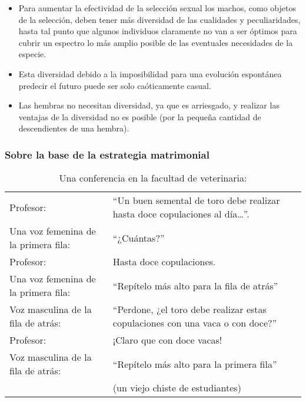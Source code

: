 \begin{itemize}
\tightlist
\item
  Para aumentar la efectividad de la selección sexual los machos, como
  objetos de la selección, deben tener más diversidad de las cualidades
  y peculiaridades, hasta tal punto que algunos individuos claramente no
  van a ser óptimos para cubrir un espectro lo más amplio posible de las
  eventuales necesidades de la especie.
\item
  Esta diversidad debido a la imposibilidad para una evolución
  espontánea predecir el futuro puede ser solo caóticamente casual.
\item
  Las hembras no necesitan diversidad, ya que es arriesgado, y realizar
  las ventajas de la diversidad no es posible (por la pequeña cantidad
  de descendientes de una hembra).
\end{itemize}

\protect\hypertarget{M6}{}{}

\subsubsection{Sobre la base de la estrategia
matrimonial}\label{sobre-la-base-de-la-estrategia-matrimonial}

\begin{longtable}[]{@{}ll@{}}
\caption{Una conferencia en la facultad de veterinaria:}\tabularnewline
\toprule
Profesor: & ``Un buen semental de toro debe realizar hasta doce
copulaciones al día\ldots{}''.\tabularnewline
Una voz femenina de la primera fila: & ``¿Cuántas?''\tabularnewline
Profesor: & Hasta doce copulaciones.\tabularnewline
Una voz femenina de la primera fila: & ``Repítelo más alto para la fila
de atrás''\tabularnewline
Voz masculina de la fila de atrás: & ``Perdone, ¿el toro debe realizar
estas copulaciones con una vaca o con doce?''\tabularnewline
Profesor: & ¡Claro que con doce vacas!\tabularnewline
Voz masculina de la fila de atrás: & ``Repítelo más alto para la primera
fila''\tabularnewline
& (un viejo chiste de estudiantes)\tabularnewline
\bottomrule
\end{longtable}

